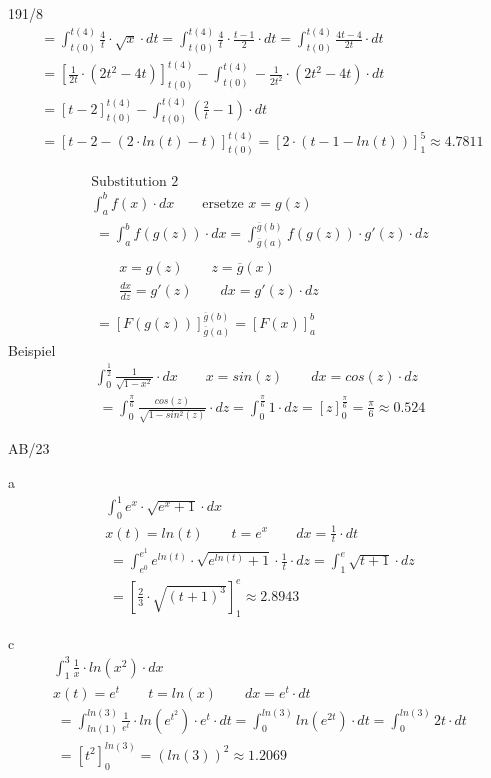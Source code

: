 \begin{exercise}{191/8}
\begin{gather*}
    \;= \int_{t(0)}^{t(4)} \frac{4}{t} \cdot \sqrt{x} \cdot dt = \int_{t(0)}^{t(4)} \frac{4}{t} \cdot \frac{t - 1}{2} \cdot dt = \int_{t(0)}^{t(4)} \frac{4t - 4}{2t} \cdot dt \\
    \;= \left[\frac{1}{2t} \cdot (2t^2 - 4t)\right]_{t(0)}^{t(4)} - \int_{t(0)}^{t(4)} - \frac{1}{2t^2} \cdot (2t^2 - 4t) \cdot dt \\
    \;= \left[t - 2\right]_{t(0)}^{t(4)} - \int_{t(0)}^{t(4)} (\frac{2}{t} - 1) \cdot dt \\
    \;= \left[t - 2 - (2 \cdot ln(t) - t)\right]_{t(0)}^{t(4)} = \left[2 \cdot (t - 1 - ln(t))\right]_1^5 \approx 4.7811
  \end{gather*}
\end{exercise}
\begin{gather*}
  \text{Substitution 2} \\
  \int_a^b f(x) \cdot dx \qquad \text{ersetze } x = g(z) \\
  \;= \int_a^b f(g(z)) \cdot dx = \int_{\overline{g}(a)}^{\overline{g}(b)} f(g(z)) \cdot g'(z) \cdot dz \\\\
  \qquad x = g(z) \qquad z = \overline{g}(x) \\
  \qquad \frac{dx}{dz} = g'(z) \qquad dx = g'(z) \cdot dz \\\\
  \;= \left[F(g(z))\right]_{\overline{g}(a)}^{\overline{g}(b)} = \left[F(x)\right]_a^b
\end{gather*}
Beispiel
\begin{gather*}
  \int_0^\frac{1}{2} \frac{1}{\sqrt{1 - x^2}} \cdot dx \qquad x = sin(z) \qquad dx = cos(z) \cdot dz \\
  \;= \int_0^\frac{\pi}{6} \frac{cos(z)}{\sqrt{1 - sin^2(z)}} \cdot dz = \int_0^\frac{\pi}{6} 1 \cdot dz = \left[z\right]_0^\frac{\pi}{6} = \frac{\pi}{6} \approx 0.524
\end{gather*}
\begin{exercise}{AB/23}
  \item [a]
  \begin{gather*}
    \int_0^1 e^x \cdot \sqrt{e^x + 1} \cdot dx \\
    x(t) = ln(t) \qquad t = e^x \qquad dx = \frac{1}{t} \cdot dt \\
    \;= \int_{e^0}^{e^1} e^{ln(t)} \cdot \sqrt{e^{ln(t)} + 1} \cdot \frac{1}{t} \cdot dz = \int_1^e \sqrt{t + 1} \cdot dz \\
    \;= \left[\frac{2}{3} \cdot \sqrt{(t + 1)^3}\right]_1^e \approx 2.8943
  \end{gather*}
  \item [c]
  \begin{gather*}
    \int_1^3 \frac{1}{x} \cdot ln(x^2) \cdot dx \\
    x(t) = e^t \qquad t = ln(x) \qquad dx = e^t \cdot dt \\
    \;= \int_{ln(1)}^{ln(3)} \frac{1}{e^t} \cdot ln(e^{t^2}) \cdot e^t \cdot dt = \int_0^{ln(3)} ln(e^{2t}) \cdot dt = \int_0^{ln(3)} 2t \cdot dt \\
    \;= \left[t^2\right]_0^{ln(3)} = (ln(3))^2 \approx 1.2069
  \end{gather*}
\end{exercise}
